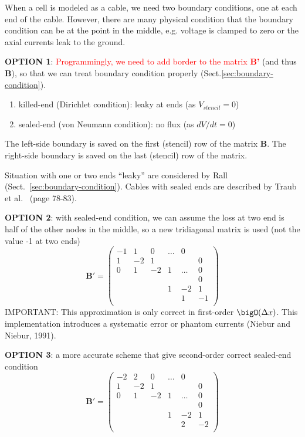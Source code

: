 When a cell is modeled as a cable, we need two boundary conditions, one at each
end of the cable. However, there are many physical condition that the boundary
condition can be at the point in the middle, e.g. voltage is clamped to zero or
the axial currents leak to the ground.

{\bf OPTION 1}:
\textcolor{red}{Programmingly, we need to add border to the matrix {\bf B'}}
(and thus {\bf B}), so that we can treat boundary condition properly
(Sect.\ref{sec:boundary-condition}).
\begin{enumerate}
  \item killed-end (Dirichlet condition): leaky at ends (as $V_{stencil}=0$)
  \item sealed-end (von Neumann condition): no flux (as $dV/dt = 0$)
\end{enumerate}
The left-side boundary is saved on the first (stencil) row of the matrix
$\mathbf{B}$.
The right-side boundary is saved on the last (stencil) row of the matrix.

Situation with one or two ends ``leaky'' are considered by
Rall (Sect.~\ref{sec:boundary-condition}). Cables with sealed ends are described
by Traub et al.~\citep{traub1991nnh} (page 78-83).

{\bf OPTION 2}:  with sealed-end condition, we can assume the loss at two end is
half of the other nodes in the middle, so a new tridiagonal matrix is used (not
the value -1 at two ends)
\begin{equation}
\mathbf{B'} = \left( 
\begin{array}{cccccc}
-1 & 1 & 0  & \ldots & 0 & \\
1 & -2 & 1 & & & 0 \\
0 &  1 & -2 & 1 & \ldots & 0\\
 & &  & & & 0\\
 & & & 1 & -2 & 1 \\
 & & & & 1 & -1 \\ 
\end{array}
\right)
\end{equation}
IMPORTANT: This approximation is only correct in first-order 
$\bigO(\Delta x)$.
This implementation introduces a systematic error or phantom currents (Niebur
and Niebur, 1991).

{\bf OPTION 3}: a more accurate scheme that give second-order correct sealed-end
condition
\begin{equation}
\mathbf{B'} = \left( 
\begin{array}{cccccc}
-2 & 2 & 0  & \ldots & 0 & \\
1 & -2 & 1 & & & 0\\
0 &  1 & -2 & 1 & \ldots & 0\\
 & &  & & &  0\\
 & & & 1 & -2 & 1 \\
 & & & & 2 & -2 \\ 
\end{array}
\right)
\end{equation}

